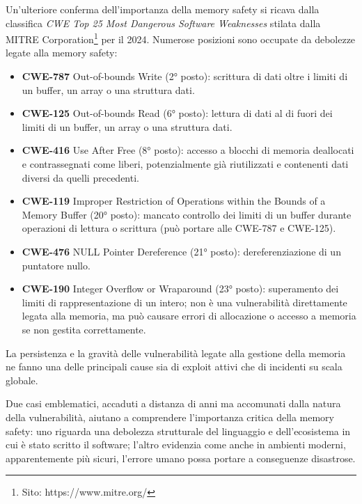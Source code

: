 Un'ulteriore conferma dell'importanza della memory safety si ricava dalla classifica
\textit{CWE Top 25 Most Dangerous Software Weaknesses}\cite{cwe_top25_2024} stilata
dalla MITRE Corporation\footnote{Sito: https://www.mitre.org/} per il 2024.
Numerose posizioni sono occupate da debolezze legate alla memory safety:
\begin{itemize}
  \item \textbf{CWE-787} Out-of-bounds Write (2° posto): scrittura di dati oltre
    i limiti di un buffer, un array o una struttura dati.

  \item \textbf{CWE-125} Out-of-bounds Read (6° posto): lettura di dati al di fuori
    dei limiti di un buffer, un array o una struttura dati.

  \item \textbf{CWE-416} Use After Free (8° posto): accesso a blocchi di memoria
    deallocati e contrassegnati come liberi, potenzialmente già riutilizzati e
    contenenti dati diversi da quelli precedenti.

  \item \textbf{CWE-119} Improper Restriction of Operations within the Bounds of
    a Memory Buffer (20° posto): mancato controllo dei limiti di un buffer durante
    operazioni di lettura o scrittura (può portare alle CWE-787 e CWE-125).

  \item \textbf{CWE-476} NULL Pointer Dereference (21° posto): dereferenziazione
    di un puntatore nullo.

  \item \textbf{CWE-190} Integer Overflow or Wraparound (23° posto): superamento
    dei limiti di rappresentazione di un intero; non è una vulnerabilità
    direttamente legata alla memoria, ma può causare errori di allocazione o accesso
    a memoria se non gestita correttamente.
\end{itemize}
La persistenza e la gravità delle vulnerabilità legate alla gestione della memoria
ne fanno una delle principali cause sia di exploit attivi che di incidenti su scala
globale.

\bigskip
\noindent
Due casi emblematici, accaduti a distanza di anni ma accomunati dalla natura
della vulnerabilità, aiutano a comprendere l'importanza critica della memory safety:
uno riguarda una debolezza strutturale del linguaggio e dell'ecosistema in cui è
stato scritto il software; l'altro evidenzia come anche in ambienti moderni,
apparentemente più sicuri, l'errore umano possa portare a conseguenze disastrose.

